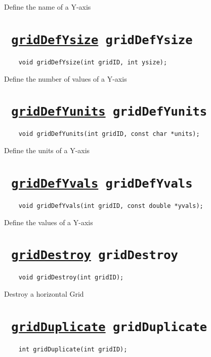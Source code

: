 Define the name of a Y-axis
\ifpdfoutput{}{(\ref{gridDefYname})}


\section*{\tt 
\ifpdf
\hyperref[gridDefYsize]{gridDefYsize}
\else
gridDefYsize
\fi
}
\begin{verbatim}
    void gridDefYsize(int gridID, int ysize);
\end{verbatim}

Define the number of values of a Y-axis
\ifpdfoutput{}{(\ref{gridDefYsize})}


\section*{\tt 
\ifpdf
\hyperref[gridDefYunits]{gridDefYunits}
\else
gridDefYunits
\fi
}
\begin{verbatim}
    void gridDefYunits(int gridID, const char *units);
\end{verbatim}

Define the units of a Y-axis
\ifpdfoutput{}{(\ref{gridDefYunits})}


\section*{\tt 
\ifpdf
\hyperref[gridDefYvals]{gridDefYvals}
\else
gridDefYvals
\fi
}
\begin{verbatim}
    void gridDefYvals(int gridID, const double *yvals);
\end{verbatim}

Define the values of a Y-axis
\ifpdfoutput{}{(\ref{gridDefYvals})}


\section*{\tt 
\ifpdf
\hyperref[gridDestroy]{gridDestroy}
\else
gridDestroy
\fi
}
\begin{verbatim}
    void gridDestroy(int gridID);
\end{verbatim}

Destroy a horizontal Grid
\ifpdfoutput{}{(\ref{gridDestroy})}


\section*{\tt 
\ifpdf
\hyperref[gridDuplicate]{gridDuplicate}
\else
gridDuplicate
\fi
}
\begin{verbatim}
    int gridDuplicate(int gridID);
\end{verbatim}

